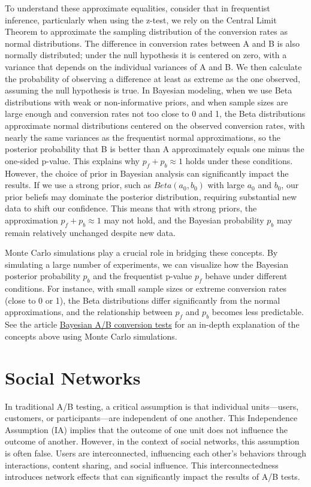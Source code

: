 \documentclass[final,5p,times,twocolumn,authoryear]{elsarticle}
\begin{document}
To understand these approximate equalities, consider that in frequentist inference, particularly when using the z-test, we rely on the Central Limit Theorem to approximate the sampling distribution of the conversion rates as normal distributions. The difference in conversion rates between A and B is also normally distributed; under the null hypothesis it is centered on zero, with a variance that depends on the individual variances of A and B. We then calculate the probability of observing a difference at least as extreme as the one observed, assuming the null hypothesis is true. In Bayesian modeling, when we use Beta distributions with weak or non-informative priors, and when sample sizes are large enough and conversion rates not too close to 0 and 1, the Beta distributions approximate normal distributions centered on the observed conversion rates, with nearly the same variances as the frequentist normal approximations, so the posterior probability that B is better than A approximately equals one minus the one-sided p-value. This explains why $ p_f + p_b \approx 1 $ holds under these conditions. However, the choice of prior in Bayesian analysis can significantly impact the results. If we use a strong prior, such as $ Beta(a_0, b_0) $ with large $ a_0 $ and $ b_0 $, our prior beliefs may dominate the posterior distribution, requiring substantial new data to shift our confidence. This means that with strong priors, the approximation $ p_f + p_b \approx 1 $ may not hold, and the Bayesian probability $ p_b $ may remain relatively unchanged despite new data.

Monte Carlo simulations play a crucial role in bridging these concepts. By simulating a large number of experiments, we can visualize how the Bayesian posterior probability $ p_b $ and the frequentist p-value $ p_f $ behave under different conditions. For instance, with small sample sizes or extreme conversion rates (close to 0 or 1), the Beta distributions differ significantly from the normal approximations, and the relationship between $ p_f $ and $ p_b $ becomes less predictable. See the article \href{https://bytepawn.com/bayesian-ab-conversion-tests.html}{Bayesian A/B conversion tests} for an in-depth explanation of the concepts above using Monte Carlo simulations.

\section{Social Networks}

In traditional A/B testing, a critical assumption is that individual units—users, customers, or participants—are independent of one another. This Independence Assumption (IA) implies that the outcome of one unit does not influence the outcome of another. However, in the context of social networks, this assumption is often false. Users are interconnected, influencing each other's behaviors through interactions, content sharing, and social influence. This interconnectedness introduces network effects that can significantly impact the results of A/B tests.
\end{document}
